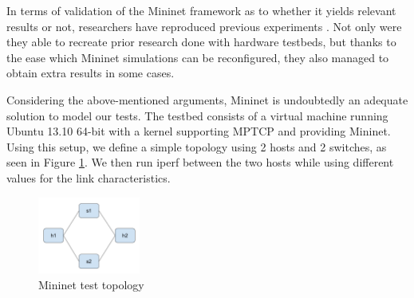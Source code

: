 In terms of validation of the Mininet framework as to whether it yields
relevant results or not, researchers have reproduced previous experiments
\cite{mininet-reproduce}. Not only were they able to recreate prior research
done with hardware testbeds, but thanks to the ease which Mininet simulations
can be reconfigured, they also managed to obtain extra results in some cases.

Considering the above-mentioned arguments, Mininet is undoubtedly an adequate
solution to model our tests. The testbed consists of a virtual machine running
Ubuntu 13.10 64-bit with a kernel supporting MPTCP and providing Mininet.
Using this setup, we define a simple topology using 2 hosts and 2 switches, as
seen in Figure \ref{fig:mininet-topo}. We then run iperf between the two hosts
while using different values for the link characteristics.

\begin{figure}
  \centering
  \includegraphics[width=0.3\textwidth]{img/mininet-topo}
  \caption{Mininet test topology}
  \label{fig:mininet-topo}
\end{figure}

